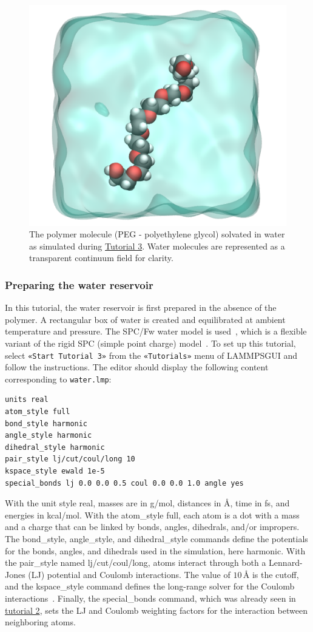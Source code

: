 \documentclass[9pt,tutorial]{livecoms}
\newcommand{\lmpcmd}[1]{\hspace{0pt}\colorbox{listing}{\textcolor{command}{\small{#1}}}\hspace{0pt}} %
\newcommand{\flecmd}[1]{\textcolor{command}{\texttt{#1}}} %
\newcommand{\guicmd}[1]{\textcolor{command}{\texttt{«#1»}}} %
\newcommand{\lammpsgui}{\textsf{LAMMPS\textendash GUI}}
\begin{document}
\begin{figure}
\centering
\includegraphics[width=0.55\linewidth]{PEG}
\caption{The polymer molecule (PEG - polyethylene glycol) solvated in water as
simulated during \hyperref[all-atom-label]{Tutorial 3}.  Water molecules are
represented as a transparent continuum field for clarity.}
\label{fig:PEG}
\end{figure}

\subsubsection{Preparing the water reservoir}

In this tutorial, the water reservoir is first prepared in the absence of the polymer.
A rectangular box of water is created and equilibrated at ambient temperature and
pressure.  The SPC/Fw water model is used~\cite{wu2006flexible}, which is
a flexible variant of the rigid SPC (simple point charge) model~\cite{berendsen1981interaction}.
To set up this tutorial, select \guicmd{Start Tutorial 3} from the
\guicmd{Tutorials} menu of \lammpsgui{} and follow the instructions.
The editor should display the following content corresponding to \flecmd{water.lmp}:
\begin{lstlisting}
units real
atom_style full
bond_style harmonic
angle_style harmonic
dihedral_style harmonic
pair_style lj/cut/coul/long 10
kspace_style ewald 1e-5
special_bonds lj 0.0 0.0 0.5 coul 0.0 0.0 1.0 angle yes
\end{lstlisting}
With the unit style \lmpcmd{real}, masses are in g/mol, distances in Å,
time in fs, and energies in kcal/mol.  With the \lmpcmd{atom\_style
  full}, each atom is a dot with a mass and a charge that can be linked
by bonds, angles, dihedrals, and/or impropers.  The
\lmpcmd{bond\_style}, \lmpcmd{angle\_style}, and
\lmpcmd{dihedral\_style} commands define the potentials for the bonds,
angles, and dihedrals used in the simulation, here \lmpcmd{harmonic}.
With the \lmpcmd{pair\_style} named \lmpcmd{lj/cut/coul/long}, atoms
interact through both a Lennard-Jones (LJ) potential and Coulomb
interactions.  The value of $10\,\text{\AA{}}$ is the cutoff, and the
\lmpcmd{kspace\_style} command defines the long-range solver for the Coulomb
interactions~\cite{ewald1921berechnung}.  Finally, the
\lmpcmd{special\_bonds} command, which was already seen in
\hyperref[carbon-nanotube-label]{tutorial 2}, sets the LJ and Coulomb
weighting factors for the interaction between neighboring atoms.
\end{document}
